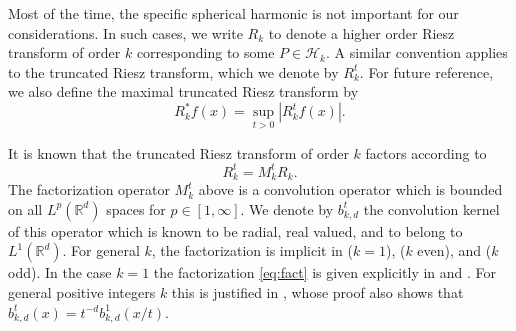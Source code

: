 \documentclass[a4paper,12pt,reqno]{amsart}
\numberwithin{equation}{section}
\theoremstyle{definition}
\newcommand{\R}{\mathbb{R}}
\newcommand{\mH}{\mathcal{H}}
\begin{document}
Most of the  time, the specific spherical harmonic  is not important  for our considerations. In such cases, we write $R_k$ to denote a higher order Riesz transform of order $k$ corresponding to some $P\in \mH_k.$  A similar convention applies to the truncated Riesz transform, which we denote by $R_k^t.$ For future reference, we also define the maximal truncated Riesz transform by
\[
R_k^*f(x)=\sup_{t>0}|R_k^t f(x)|.
\]

It is known that the truncated Riesz transform of order $k$ factors according to
\begin{equation}
\label{eq:fact}
R_k^t=M^t_k R_k.
\end{equation}
The factorization operator $M^t_k$ above is a convolution operator which is bounded on all $L^p(\R^d)$ spaces for $p\in [1,\infty].$ We denote by $b_{k,d}^t$ the convolution kernel of this operator which is known to be radial, real valued, and to belong to $L^1(\R^d)$. For general  $k$, the factorization is  implicit in \cite[Section 2]{mateu_verdera} ($k=1$), \cite[Section 2]{mov1} ($k$ even), and \cite[Section 4]{mopv} ($k$ odd). In the case $k=1$ the factorization \eqref{eq:fact} is given explicitly in \cite{kw} and \cite{LiuMeZhu}. For general positive integers $k$ this is justified in \cite[Proposition 2.1]{kwz}, whose proof also shows that  $b_{k,d}^t(x)=t^{-d}b_{k,d}^1(x/t).$ 
\end{document}
